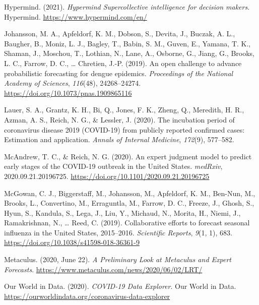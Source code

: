 \documentclass[
]{article}
\newlength{\cslhangindent}
\newlength{\cslentryspacingunit} %
\newenvironment{CSLReferences}[2] %
 {%
  \setlength{\parindent}{0pt}
  \ifodd #1
  \let\oldpar\par
  \def\par{\hangindent=\cslhangindent\oldpar}
  \fi
  \setlength{\parskip}{#2\cslentryspacingunit}
 }%
 {}
\begin{document}
\begin{CSLReferences}{1}{0}
\leavevmode{}%
Hypermind. (2021). \emph{Hypermind \textbar{} {Supercollective} intelligence for decision makers}. {Hypermind}. \url{https://www.hypermind.com/en/}

\leavevmode{}%
Johansson, M. A., Apfeldorf, K. M., Dobson, S., Devita, J., Buczak, A. L., Baugher, B., Moniz, L. J., Bagley, T., Babin, S. M., Guven, E., Yamana, T. K., Shaman, J., Moschou, T., Lothian, N., Lane, A., Osborne, G., Jiang, G., Brooks, L. C., Farrow, D. C., \ldots{} Chretien, J.-P. (2019). An open challenge to advance probabilistic forecasting for dengue epidemics. \emph{Proceedings of the National Academy of Sciences}, \emph{116}(48), 24268--24274. \url{https://doi.org/10.1073/pnas.1909865116}

\leavevmode{}%
Lauer, S. A., Grantz, K. H., Bi, Q., Jones, F. K., Zheng, Q., Meredith, H. R., Azman, A. S., Reich, N. G., \& Lessler, J. (2020). The incubation period of coronavirus disease 2019 (COVID-19) from publicly reported confirmed cases: Estimation and application. \emph{Annals of Internal Medicine}, \emph{172}(9), 577--582.

\leavevmode{}%
McAndrew, T. C., \& Reich, N. G. (2020). An expert judgment model to predict early stages of the {COVID}-19 outbreak in the {United States}. \emph{medRxiv}, 2020.09.21.20196725. \url{https://doi.org/10.1101/2020.09.21.20196725}

\leavevmode{}%
McGowan, C. J., Biggerstaff, M., Johansson, M., Apfeldorf, K. M., Ben-Nun, M., Brooks, L., Convertino, M., Erraguntla, M., Farrow, D. C., Freeze, J., Ghosh, S., Hyun, S., Kandula, S., Lega, J., Liu, Y., Michaud, N., Morita, H., Niemi, J., Ramakrishnan, N., \ldots{} Reed, C. (2019). Collaborative efforts to forecast seasonal influenza in the {United States}, 2015--2016. \emph{Scientific Reports}, \emph{9}(1, 1), 683. \url{https://doi.org/10.1038/s41598-018-36361-9}

\leavevmode{}%
Metaculus. (2020, June 22). \emph{A {Preliminary Look} at {Metaculus} and {Expert Forecasts}}. \url{https://www.metaculus.com/news/2020/06/02/LRT/}

\leavevmode{}%
Our World in Data. (2020). \emph{{COVID}-19 {Data Explorer}}. {Our World in Data}. \url{https://ourworldindata.org/coronavirus-data-explorer}


\end{CSLReferences}
\end{document}
